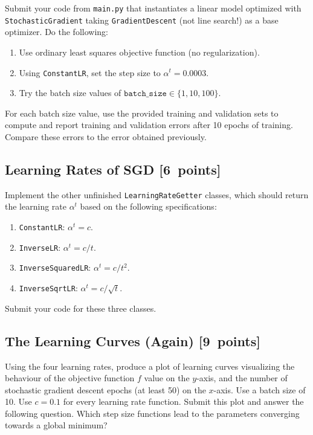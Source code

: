 \documentclass{article}
\newcommand{\blu}[1]{{\textcolor{blu}{#1}}}
\let\ask\blu
\newcommand\pts[1]{\textcolor{pointscolour}{[#1~points]}}
\begin{document}
\ask{Submit your code} from \texttt{main.py} that instantiates a linear model optimized with \texttt{StochasticGradient} taking \texttt{GradientDescent} (not line search!) as a base optimizer. Do the following:
\begin{enumerate}
		\item Use ordinary least squares objective function (no regularization).
		\item Using \texttt{ConstantLR}, set the step size to $\alpha^t = 0.0003$.
		\item Try the batch size values of $\texttt{batch\_size} \in \{1, 10, 100\}$.
\end{enumerate}
\ask{For each batch size value, use the provided training and validation sets to compute and report training and validation errors after 10 epochs of training. Compare these errors to the error obtained previously.}


\subsection{Learning Rates of SGD \pts{6}}

Implement the other unfinished \texttt{LearningRateGetter} classes, which should return the learning rate $\alpha^t$ based on the following
specifications:
\begin{enumerate}
	\item \texttt{ConstantLR}: $\alpha^t = c$.
	\item \texttt{InverseLR}: $\alpha^t = c/t$.
	\item \texttt{InverseSquaredLR}: $\alpha^t = c/t^2$.
	\item \texttt{InverseSqrtLR}: $\alpha^t = c/\sqrt{t}$.
\end{enumerate}
\ask{Submit your code for these three classes.}



\subsection{The Learning Curves (Again) \pts{9}}

Using the four learning rates, produce a plot of learning curves visualizing the behaviour of the objective function $f$ value on the $y$-axis, and the number of stochastic gradient descent epochs (at least 50) on the $x$-axis. Use a batch size of 10. Use $c = 0.1$ for every learning rate function. \blu{Submit this plot and answer the following question. Which step size functions lead to the parameters converging towards a global minimum?}
\end{document}
